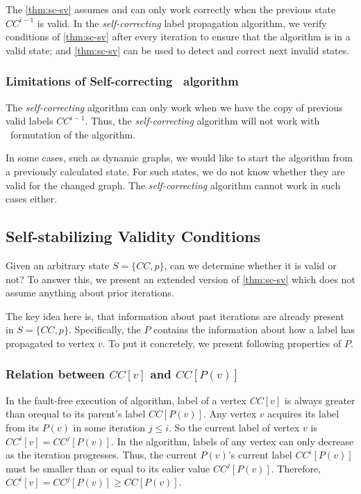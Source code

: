 
The \cref{thm:sc-sv}  assumes and can only work correctly when the previous state $CC^{i-1}$  is valid. In the \emph{self-correcting} label propagation algorithm,  we verify conditions of \cref{thm:sc-sv} after every iteration to ensure that the algorithm is in a valid state; and \cref{thm:sc-sv} can be used to detect and correct next invalid states. 

\subsubsection{Limitations of Self-correcting \sv~algorithm}
The \emph{self-correcting} algorithm can only work when we have the copy of previous valid labels  $CC^{i-1}$. Thus, the \emph{self-correcting} \sv algorithm will not work with \async~formutation of the \sv algorithm. 

In some cases, such as dynamic graphs, we would like to start the algorithm from a previously calculated state. For such states, we do not know whether they are valid for the changed graph.  The \emph{self-correcting} algorithm cannot work in such cases either.


\subsection{ Self-stabilizing Validity Conditions}

Given an arbitrary state $S=\{CC, p\}$, can we determine whether it is valid
or not?  To answer this, we present an extended version of \cref{thm:sc-sv}
which does not assume anything about prior iterations.

The key idea here is, that information about past iterations are already
present in $S=\{CC, p\}$.  Specifically, the $P$ contains the information
about how a label has propagated to vertex $v$. To put it concretely,  we
present following properties of $P$.

\subsubsection{ Relation between $CC[v]$ and $CC[P(v)]$} 

 In the fault-free execution of  \sv algorithm,  label of a vertex $CC[v]$ is
always greater than orequal to its parent's label  $CC[P(v)]$. Any vertex $v$
acquires its label from its $P(v)$ in some iteration $j\leq i$. So the current
label of vertex $v$ is $CC^{i}[v]=CC^{j}[P(v)]$. In the \sv algorithm, labels
of any vertex can only decrease as the iteration progresses. Thus, the current
$P(v)$'s current label $  CC^{i}[P(v)] $ must be smaller than or equal to its
ealier value $CC^{j}[P(v)]$.  Therefore,  $CC^{i}[v] =CC^{j}[P(v)] \geq
CC[P(v)]$.

